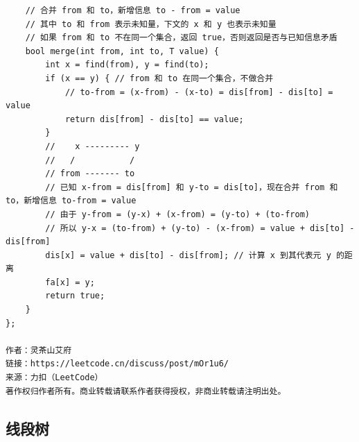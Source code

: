 \documentclass[UTF8,twoside]{ctexart}
\begin{document}
\begin{lstlisting}
    // 合并 from 和 to，新增信息 to - from = value
    // 其中 to 和 from 表示未知量，下文的 x 和 y 也表示未知量
    // 如果 from 和 to 不在同一个集合，返回 true，否则返回是否与已知信息矛盾
    bool merge(int from, int to, T value) {
        int x = find(from), y = find(to);
        if (x == y) { // from 和 to 在同一个集合，不做合并
            // to-from = (x-from) - (x-to) = dis[from] - dis[to] = value
            return dis[from] - dis[to] == value;
        }
        //    x --------- y
        //   /           /
        // from ------- to
        // 已知 x-from = dis[from] 和 y-to = dis[to]，现在合并 from 和 to，新增信息 to-from = value
        // 由于 y-from = (y-x) + (x-from) = (y-to) + (to-from)
        // 所以 y-x = (to-from) + (y-to) - (x-from) = value + dis[to] - dis[from]
        dis[x] = value + dis[to] - dis[from]; // 计算 x 到其代表元 y 的距离
        fa[x] = y;
        return true;
    }
};

作者：灵茶山艾府
链接：https://leetcode.cn/discuss/post/mOr1u6/
来源：力扣（LeetCode）
著作权归作者所有。商业转载请联系作者获得授权，非商业转载请注明出处。
\end{lstlisting}
\subsection{线段树}
\end{document}
